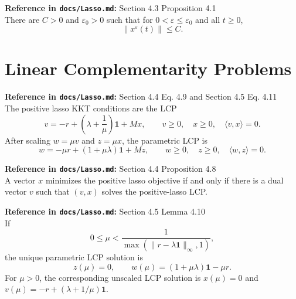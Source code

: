 \begin{proposition}\label{prop:posTrajectoryBound}
  \textbf{Reference in \texttt{docs/Lasso.md}:} Section 4.3 Proposition 4.1\\
There are $C>0$ and $\varepsilon_0>0$ such that for
$0<\varepsilon\le \varepsilon_0$ and all $t\ge0$,
\[
  \|x^\varepsilon(t)\|\le C.
\]
\end{proposition}

\section{Linear Complementarity Problems}

\begin{definition}\label{def:lassoLCP}
  \textbf{Reference in \texttt{docs/Lasso.md}:} Section 4.4 Eq. 4.9 and Section 4.5 Eq. 4.11\\
The positive lasso KKT conditions are the LCP
\[
  v = -r+\left(\lambda+\frac1\mu\right)\mathbf{1}+Mx,
  \qquad
  v\ge 0,\quad x\ge 0,\quad \langle v,x\rangle=0.
\]
After scaling $w=\mu v$ and $z=\mu x$, the parametric LCP is
\[
  w = -\mu r+(1+\mu\lambda)\mathbf{1}+Mz,
  \qquad
  w\ge 0,\quad z\ge 0,\quad \langle w,z\rangle=0.
\]
\end{definition}

\begin{proposition}\label{prop:posLassoIffLCP}
  \textbf{Reference in \texttt{docs/Lasso.md}:} Section 4.4 Proposition 4.8\\
A vector $x$ minimizes the positive lasso objective if and only if there is a
dual vector $v$ such that $(v,x)$ solves the positive-lasso LCP.
\end{proposition}

\begin{lemma}\label{lem:parametricSmallMu}
  \textbf{Reference in \texttt{docs/Lasso.md}:} Section 4.5 Lemma 4.10\\
If
\[
  0\le\mu<\frac{1}{\max(\|r-\lambda\mathbf 1\|_\infty,1)},
\]
the unique parametric LCP solution is
\[
  z(\mu)=0,\qquad w(\mu)=(1+\mu\lambda)\mathbf{1}-\mu r.
\]
For $\mu>0$, the corresponding unscaled LCP solution is
$x(\mu)=0$ and $v(\mu)=-r+(\lambda+1/\mu)\mathbf 1$.
\end{lemma}

